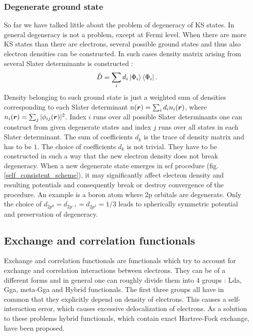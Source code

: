 \documentclass[openany, longbibliography,slovene,a4paper,12pt]{article}
\def\vec#1{\mbox{\boldmath$#1$}}
\begin{document}
\subsubsection{Degenerate ground state}
So far we have talked little about the problem of degeneracy of KS states. In
general degeneracy is not a problem, except at Fermi level. When there are more
KS states than there are electrons, several possible ground states and thus also
electron densities can be constructed. In such cases density matrix arising from
several Slater determinants is constructed \cite{advanced_course}:
\begin{equation}
  \hat D = \sum_i d_i\ket{\Phi_i} \bra{\Phi_i}.
  \end{equation}
Density belonging to such ground state is just a weighted sum of densities
corresponding to each Slater determinant $n(\vec r)=\sum_id_in_i(\vec r)$, where
$n_i(\vec r)=\sum_j|\phi_{ij}(\vec r)|^2$. Index $i$ runs over all possible
Slater determinants one can construct from given degenerate states and index $j$
runs over all states in each Slater determinant. The sum of coefficients $d_k$
is the trace of density matrix and has to be $1$. The choice of coefficients
$d_k$ is not trivial. They have to be constructed in such a way that the new
electron density does not break degeneracy. When a new degenerate state emerges in
scf procedure (fig. \ref{self_consistent_scheme}), it may significantly affect
electron density and resulting potentials and consequently break or destroy
convergence of the procedure. An example is a boron atom where 2p orbitals are
degenerate. Only the choice of $d_{2p^0}=d_{2p^{-1}}=d_{2p^1}=1/3$ leads to spherically symmetric potential and preservation of degeneracy\cite{advanced_course}.

\subsection{Exchange and correlation functionals}
Exchange and correlation functionals are functionals which try to account for
exchange and correlation interactions between electrons. They can be of a
different forms and in general one can roughly divide them into 4 groups
\cite{challenges_den_fun_theor, presc_desig_selec_densit_funct_approx}: Lda, Gga, meta-Gga and Hybrid functionals.
The first three groups all have in common that they explicitly depend on density
of electrons. This causes a self-interaction error, which causes excessive
delocalization of electrons. As a solution to these problems hybrid
functionals, which contain exact Hartree-Fock exchange, have been proposed.
\end{document}

